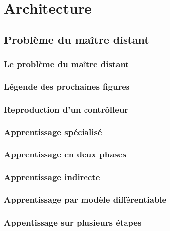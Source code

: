 \section{Architecture}
\subsection{Problème du maître distant}

\begin{frame}
 \frametitle{Le problème du maître distant}
 
\end{frame}

\begin{frame}
 \frametitle{Légende des prochaines figures}
 
\end{frame}

\begin{frame}
 \frametitle{Reproduction d'un contrôlleur}
 
\end{frame}

\begin{frame}
 \frametitle{Apprentissage spécialisé}
 
\end{frame}

\begin{frame}
 \frametitle{Apprentissage en deux phases}
 
\end{frame}

\begin{frame}
 \frametitle{Apprentissage indirecte}
 
\end{frame}

\begin{frame}
 \frametitle{Apprentissage par modèle différentiable}
 
\end{frame}

\begin{frame}
 \frametitle{Appentissage sur plusieurs étapes} %
 
\end{frame}